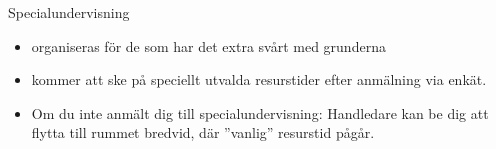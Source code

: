 \begin{SlideExtra}{Specialundervisning}
\begin{itemize}
\item  {} organiseras för de som har det extra svårt med grunderna
\item kommer att ske på speciellt utvalda resurstider efter anmälning via enkät.
\item Om du inte anmält dig till specialundervisning: Handledare kan be dig att flytta till rummet bredvid, där ''vanlig'' resurstid pågår. 
\end{itemize}
\end{SlideExtra}
\fi

